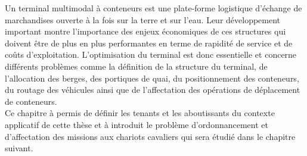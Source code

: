 
Un terminal multimodal à conteneurs est une plate-forme logistique d'échange de marchandises ouverte à la fois sur la terre et sur l'eau. Leur développement important montre l'importance des enjeux économiques de ces structures qui doivent être de plus en plus performantes en terme de rapidité de service et de coûts d'exploitation.
L'optimisation du terminal est donc essentielle et concerne différents problèmes comme la définition de la structure du terminal, de l'allocation des berges, des portiques de quai, du positionnement des conteneurs, du routage des véhicules ainsi que de l'affectation des opérations de déplacement de conteneurs.\\


Ce chapitre à permis de définir les tenants et les aboutissants du contexte applicatif de cette thèse et à introduit le problème d'ordonnancement et d'affectation des missions aux chariots cavaliers qui sera étudié dans le chapitre suivant.